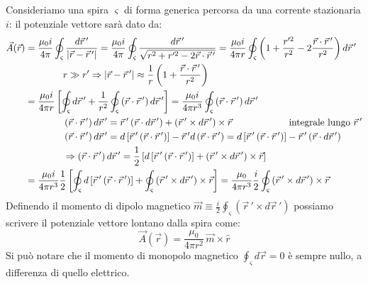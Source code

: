 \documentclass[]{article}
\begin{document}
Consideriamo una spira $ \varsigma $ di forma generica percorsa da una corrente stazionaria $ i $: il potenziale vettore sarà dato da:
\begin{equation}
	\begin{split}
		\vec{A}(\vec{r}) &= \displaystyle\frac{\mu_0 i}{4\pi} \oint_{\varsigma} \displaystyle\frac{d\vec{r}\,'}{\left\lvert\vec{r} - \vec{r}\,'\right\rvert} = \displaystyle\frac{\mu_0 i}{4\pi} \oint_{\varsigma} \displaystyle\frac{d\vec{r}\,'}{\sqrt{r^2 + r'^2 - 2\vec{r}\cdot\vec{r}\,'}} = \displaystyle\frac{\mu_0 i}{4\pi r} \oint_{\varsigma} \left( 1 + \displaystyle\frac{r'^2}{r^2} - 2 \displaystyle\frac{\vec{r}\cdot\vec{r}\,'}{r^2} \right) d\vec{r}\,' \\ 
				 & \qquad\qquad r \gg r' \Rightarrow \left\lvert\vec{r} - \vec{r}\,'\right\rvert \approx \frac{1}{r} \left(1 + \frac{\vec{r}\cdot\vec{r}\,'}{r^2}\right) \\ 
				 &= \displaystyle\frac{\mu_0 i}{4\pi r} \left[ \oint_{\varsigma} d\vec{r}\,' + \displaystyle\frac{1}{r^2} \oint_{\varsigma} \left( \vec{r}\cdot\vec{r}\,' \right) d\vec{r}\,' \right] = \displaystyle\frac{\mu_0 i}{4\pi r^3} \oint_{\varsigma} \left( \vec{r}\cdot\vec{r}\,' \right) d\vec{r}\,' \\ 
				 & \qquad\qquad \left(\vec{r}\cdot\vec{r}\,'\right) d\vec{r}\,' = \vec{r}\,' \left(\vec{r}\cdot d\vec{r}\,'\right) + \left(\vec{r}\,'\times d\vec{r}\,'\right)\times\vec{r} \qquad \qquad \qquad \text{integrale lungo } \vec{r}\,' \\ 
				 & \qquad\qquad \left(\vec{r}\cdot\vec{r}\,'\right) d\vec{r}\,' = d\left[\vec{r}\,'\left(\vec{r}\cdot\vec{r}\,'\right)\right] - \vec{r}\,'d\left(\vec{r}\cdot\vec{r}\,'\right) = d\left[\vec{r}\,'\left(\vec{r}\cdot\vec{r}\,'\right)\right] - \vec{r}\,'\left(\vec{r}\cdot d\vec{r}\,'\right) \\ 
				 & \qquad \qquad \Rightarrow \left(\vec{r}\cdot\vec{r}\,'\right)d\vec{r}\,' = \frac{1}{2} \left[ d\left[ \vec{r}\,' \left(\vec{r}\cdot\vec{r}\,'\right)\right] + \left(\vec{r}\,' \times d\vec{r}\,'\right) \times\vec{r} \right] \\ 
				 &= \displaystyle\frac{\mu_0 i}{4\pi r^3} \displaystyle\frac{1}{2} \left[ \oint_{\varsigma} d\left[ \vec{r}\,' \left(\vec{r}\cdot\vec{r}\,'\right)\right] + \oint_{\varsigma} \left(\vec{r}\,' \times d\vec{r}\,'\right) \times\vec{r} \right] = \displaystyle\frac{\mu_0}{4\pi r^3} \displaystyle\frac{i}{2} \oint_{\varsigma} \left(\vec{r}\,' \times d\vec{r}\,'\right) \times\vec{r} 
	\end{split}
	\label{eq:pot-vett-sp}
\end{equation}
Definendo il momento di dipolo magnetico $ \vec{m} \equiv \frac{i}{2} \oint_{\varsigma} \left(\vec{r}\,'\times d\vec{r}\,'\right) $ possiamo scrivere il potenziale vettore lontano dalla spira come:
\begin{equation}
	\vec{A}(\vec{r}) = \displaystyle\frac{\mu_0}{4\pi r^2} \, \vec{m}\times\hat{r}
	\label{eq:po-vett-sp-lont}
\end{equation}
Si può notare che il momento di monopolo magnetico $ \oint_{\varsigma} d\vec{r} = 0  $ è sempre nullo, a differenza di quello elettrico.
\end{document}
